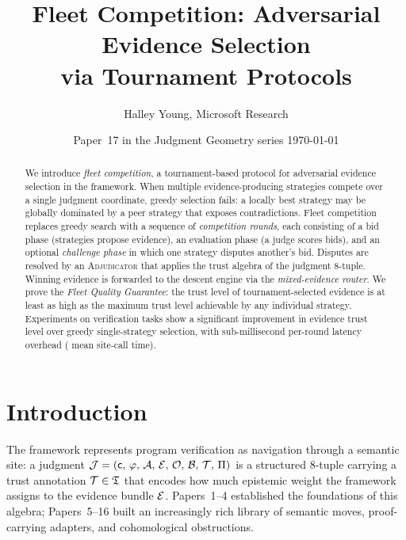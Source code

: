 \documentclass[11pt]{article}
\title{\textbf{Fleet Competition: Adversarial Evidence Selection\\
       via Tournament Protocols}}
\author{Halley Young, Microsoft Research}
\date{Paper~17 in the Judgment Geometry series \quad \today}
\begin{document}
\maketitle

\begin{abstract}
We introduce \emph{fleet competition}, a tournament-based protocol for
adversarial evidence selection in the \JuGeo{} framework.  When multiple
evidence-producing strategies compete over a single judgment coordinate,
greedy selection fails: a locally best strategy may be globally dominated by a
peer strategy that exposes contradictions.  Fleet competition replaces greedy
search with a sequence of \emph{competition rounds}, each consisting of a bid
phase (strategies propose evidence), an evaluation phase (a judge scores
bids), and an optional \emph{challenge phase} in which one strategy disputes
another's bid.  Disputes are resolved by an \textsc{Adjudicator} that applies
the trust algebra of the \JuGeo{} judgment 8-tuple.  Winning evidence is
forwarded to the descent engine via the \emph{mixed-evidence router}.  We prove
the \emph{Fleet Quality Guarantee}: the trust level of tournament-selected
evidence is at least as high as the maximum trust level achievable by any
individual strategy.  Experiments on \numcases{} verification tasks show a
significant improvement in evidence trust level over greedy single-strategy
selection, with sub-millisecond per-round latency overhead (\subSiteMeanTime{} mean site-call time).
\end{abstract}

\newpage

\section{Introduction}\label{sec:intro}

The \JuGeo{} framework represents program verification as navigation through a
semantic site: a judgment $\mathcal{J} = (\mathsf{c},\,\varphi,\,\mathcal{A},\,\mathcal{E},\,\mathcal{O},\,\mathcal{B},\,\mathcal{T},\,\Pi)$ is a structured 8-tuple carrying a trust annotation
$\mathcal{T} \in \mathfrak{T}$ that encodes how much epistemic weight the framework assigns
to the evidence bundle $\mathcal{E}$.  Papers~1--4 established the foundations of
this algebra; Papers~5--16 built an increasingly rich library of semantic
moves, proof-carrying adapters, and cohomological obstructions.
\end{document}
